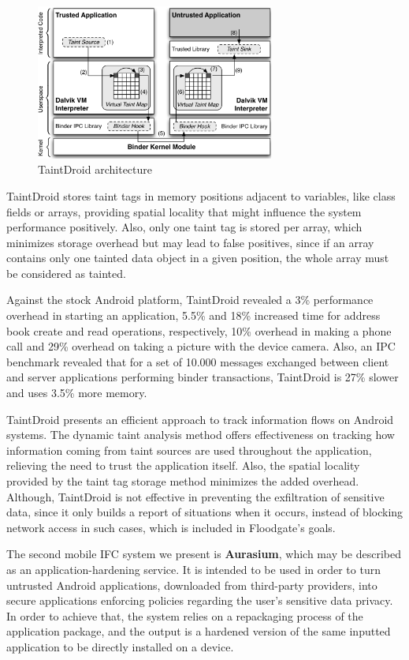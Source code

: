 \begin{figure}[t!]
\includegraphics[width=0.7\textwidth]{figs/taintdroid-arch-2}
\centering
\caption{TaintDroid architecture}
\label{fig:taintdroid-arch-2}
\end{figure}

TaintDroid stores taint tags in memory positions adjacent to variables, like class fields or arrays, providing spatial locality that might influence the system performance positively. Also, only one taint tag is stored per array, which minimizes storage overhead but may lead to false positives, since if an array contains only one tainted data object in a given position, the whole array must be considered as tainted.

Against the stock Android platform, TaintDroid revealed a 3\% performance overhead in starting an application, 5.5\% and 18\% increased time for address book create and read operations, respectively, 10\% overhead in making a phone call and 29\% overhead on taking a picture with the device camera. Also, an IPC benchmark revealed that for a set of 10.000 messages exchanged between client and server applications performing binder transactions, TaintDroid is 27\% slower and uses 3.5\% more memory.

TaintDroid presents an efficient approach to track information flows on Android systems. The dynamic taint analysis method offers effectiveness on tracking how information coming from taint sources are used throughout the application, relieving the need to trust the application itself. Also, the spatial locality provided by the taint tag storage method minimizes the added overhead. Although, TaintDroid is not effective in preventing the exfiltration of sensitive data, since it only builds a report of situations when it occurs, instead of blocking network access in such cases, which is included in Floodgate's goals.

The second mobile IFC system we present is \textbf{Aurasium}, which may be described as an application-hardening service. It is intended to be used in order to turn untrusted Android applications, downloaded from third-party providers, into secure applications enforcing policies regarding the user's sensitive data privacy. In order to achieve that, the system relies on a repackaging process of the application package, and the output is a hardened version of the same inputted application to be directly installed on a device.

